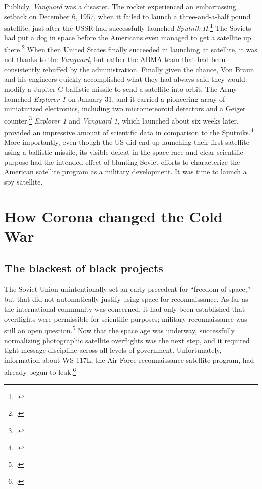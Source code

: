 \documentclass{report}
\begin{document}
Publicly, \emph{Vanguard} was a disaster. The rocket experienced an embarrassing setback on December 6, 1957, when it failed to launch a three-and-a-half pound satellite, just after the USSR had successfully launched \emph{Sputnik II}.\footcite[p.~119]{killian_sputnik_1977} The Soviets had put a dog in space before the Americans even managed to get a satellite up there.\footcite[Her name was Laika.]{george_sad_2018} When then United States finally succeeded in launching at satellite, it was not thanks to the \emph{Vanguard}, but rather the ABMA team that had been consistently rebuffed by the administration. Finally given the chance, Von Braun and his engineers quickly accomplished what they had always said they would: modify a Jupiter-C ballistic missile to send a satellite into orbit. The Army launched \emph{Explorer 1} on January 31, and it carried a pioneering array of miniaturized electronics, including two micrometeoroid detectors and a Geiger counter.\footcite[p.~168]{mcdougall_heavens_1985} \emph{Explorer 1} and \emph{Vanguard 1}, which launched about six weeks later, provided an impressive amount of scientific data in comparison to the Sputniks.\footcite[p.~168]{mcdougall_heavens_1985} More importantly, even though the US did end up launching their first satellite using a ballistic missile, its visible defeat in the space race and clear scientific purpose had the intended effect of blunting Soviet efforts to characterize the American satellite program as a military development. It was time to launch a spy satellite.

\section{How Corona changed the Cold War}
\subsection{The blackest of black projects}
The Soviet Union unintentionally set an early precedent for ``freedom of space,'' but that did not automatically justify using space for reconnaissance. As far as the international community was concerned, it had only been established that overflights were permissible for scientific purposes; military reconnaissance was still an open question.\footcite[p.~47-48]{peebles_corona_1997} Now that the space age was underway, successfully normalizing photographic satellite overflights was the next step, and it required tight message discipline across all levels of government. Unfortunately, information about WS-117L, the Air Force reconnaissance satellite program, had already begun to leak.\footcite[p.~96]{lindgren_trust_2000}
\end{document}
